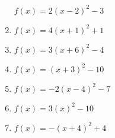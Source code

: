 \documentclass{article}%
\begin{document}
\begin{enumerate}[label=\alph*)]
\newline\vspace{0.5cm} $f(x)=2(x-2)^2 -3$%
\item%
\newline\vspace{0.5cm} $f(x)=4(x+1)^2 +1$%
\item%
\newline\vspace{0.5cm} $f(x)=3(x+6)^2 -4$%
\item%
\newline\vspace{0.5cm} $f(x)=(x+3)^2 -10$%
\item%
\newline\vspace{0.5cm} $f(x)=-2(x-4)^2 -7$%
\item%
\newline\vspace{0.5cm} $f(x)=3(x)^2 -10$%
\item%
\newline\vspace{0.5cm} $f(x)=-(x+4)^2 +4$%
\end{enumerate}

%
\end{document}

